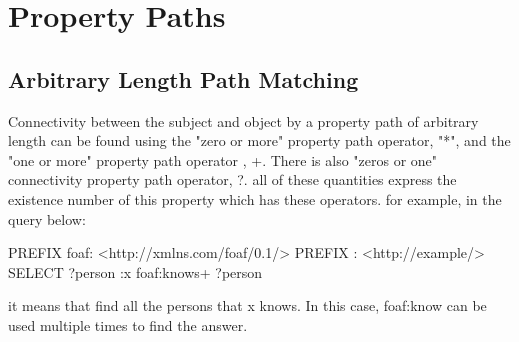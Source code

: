 \section{Property Paths}
\subsection{Arbitrary Length Path Matching}
Connectivity between the subject and object by a property path of arbitrary length can be found using the "zero or  more" property path operator, "*", and the "one or more" property path operator , +. There is also "zeros or one" connectivity property path operator, ?.
all of these quantities express the existence number of this property which has these operators.
for example, in the query below:
\begin{fullblueverb}
PREFIX foaf: <http://xmlns.com/foaf/0.1/>
PREFIX :     <http://example/>
SELECT ?person
{ 
    :x foaf:knows+ ?person
}
\end{fullblueverb}
it means that find all the persons that x knows. In this case, foaf:know can be used multiple times to find the answer.